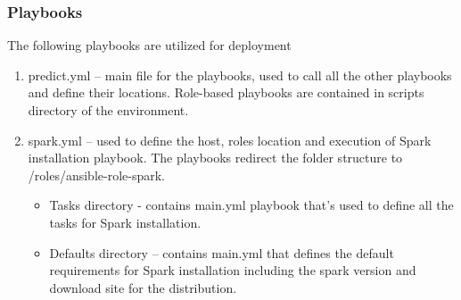 \documentclass[9pt,twocolumn,twoside]{../../styles/osajnl}
\begin{document}
\subsubsection{Playbooks}

The following playbooks are utilized for deployment

\begin{enumerate}
  \item predict.yml – main file for the playbooks, used to call all
    the other playbooks and define their locations. Role-based
    playbooks are contained in scripts directory of the environment.
  \item spark.yml – used to define the host, roles location and
    execution of Spark installation playbook. The playbooks redirect
    the folder structure to /roles/ansible-role-spark.
    \begin{itemize}
      \item Tasks directory - contains main.yml playbook that’s used
        to define all the tasks for Spark installation.
      \item Defaults directory – contains main.yml that defines the
        default requirements for Spark installation including the
        spark version and download site for the distribution. 
    \end{itemize}


\end{enumerate}
\end{document}

